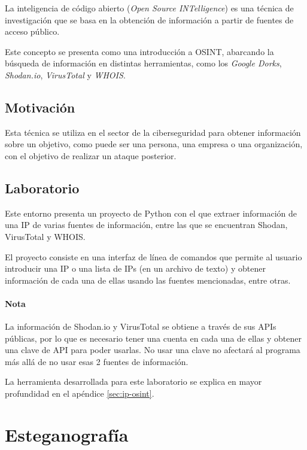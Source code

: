         La inteligencia de código abierto (\textit{Open Source INTelligence}) es una técnica de investigación que se basa en la obtención de información a partir de fuentes de acceso público.

        Este concepto se presenta como una introducción a OSINT, abarcando la búsqueda de información en distintas herramientas, como los \textit{Google Dorks}, \textit{Shodan.io}, \textit{VirusTotal} y \textit{WHOIS}.

        \subsection{Motivación}

            Esta técnica se utiliza en el sector de la ciberseguridad para obtener información sobre un objetivo, como puede ser una persona, una empresa o una organización, con el objetivo de realizar un ataque posterior.

        \subsection{Laboratorio}

            Este entorno presenta un proyecto de Python con el que extraer información de una IP de varias fuentes de información, entre las que se encuentran Shodan, VirusTotal y WHOIS.

            El proyecto consiste en una interfaz de línea de comandos que permite al usuario introducir una IP o una lista de IPs (en un archivo de texto) y obtener información de cada una de ellas usando las fuentes mencionadas, entre otras.
            
            \paragraph{Nota} La información de Shodan.io y VirusTotal se obtiene a través de sus APIs públicas, por lo que es necesario tener una cuenta en cada una de ellas y obtener una clave de API para poder usarlas. No usar una clave no afectará al programa más allá de no usar esas 2 fuentes de información.

            La herramienta desarrollada para este laboratorio se explica en mayor profundidad en el apéndice \ref{sec:ip-osint}.
        

    \section{Esteganografía}

